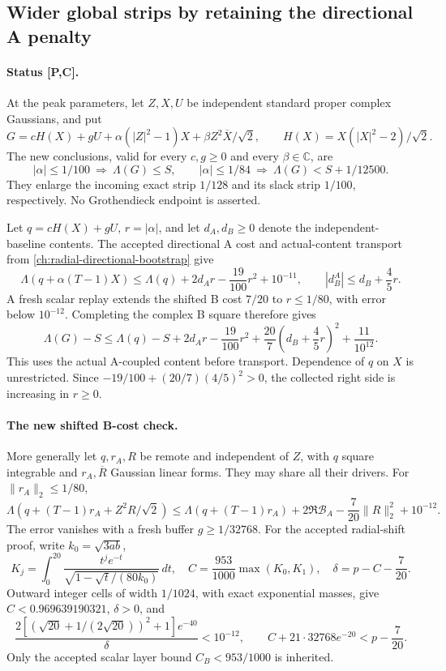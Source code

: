 \subsection{Wider global strips by retaining the directional A penalty}
\label{sec:milestone-global-strips}
\paragraph{Status \textup{[P,C]}.}
At the peak parameters, let \(Z,X,U\) be independent standard proper
complex Gaussians, and put
\[
G=cH(X)+gU+\alpha(|Z|^2-1)X+\beta Z^2\overline X/\sqrt2,
\qquad H(X)=X(|X|^2-2)/\sqrt2 .
\]
The new conclusions, valid for every \(c,g\ge0\) and every
\(\beta\in\mathbb C\), are
\[
\boxed{|\alpha|\le1/100\ \Longrightarrow\ \Lambda(G)\le S,}
\qquad
\boxed{|\alpha|\le1/84\ \Longrightarrow\ \Lambda(G)<S+1/12500.}
\]
They enlarge the incoming exact strip \(1/128\) and its slack strip
\(1/100\), respectively. No Grothendieck endpoint is asserted.

Let \(q=cH(X)+gU\), \(r=|\alpha|\), and let \(d_A,d_B\ge0\) denote
the independent-baseline contents. The accepted directional A cost
and actual-content transport from \autoref{ch:radial-directional-bootstrap} give
\[
\Lambda(q+\alpha(T-1)X)
\le\Lambda(q)+2d_A r-\frac{19}{100}r^2+10^{-11},
\qquad |d_B^A|\le d_B+\frac45r.
\]
A fresh scalar replay extends the shifted B cost \(7/20\) to
\(r\le1/80\), with error below \(10^{-12}\).
Completing the complex B square therefore gives
\begin{equation}\label{eq:milestone-strip-envelope}
\Lambda(G)-S\le\Lambda(q)-S+2d_A r-\frac{19}{100}r^2+
\frac{20}{7}\left(d_B+\frac45r\right)^2+\frac{11}{10^{12}}.
\end{equation}
This uses the actual A-coupled content before transport. Dependence
of \(q\) on \(X\) is unrestricted. Since
\(-19/100+(20/7)(4/5)^2>0\), the collected right side is increasing
in \(r\ge0\).

\paragraph{The new shifted B-cost check.}
More generally let \(q,r_A,R\) be remote and independent of \(Z\),
with \(q\) square integrable and \(r_A,\overline R\) Gaussian linear
forms. They may share all their drivers. For \(\|r_A\|_2\le1/80\),
\[
\Lambda(q+(T-1)r_A+Z^2R/\sqrt2)
\le\Lambda(q+(T-1)r_A)+2\Re\mathcal B_A
-\frac7{20}\|R\|_2^2+10^{-12}.
\]
The error vanishes with a fresh buffer \(g\ge1/32768\).
For the accepted radial-shift proof, write \(k_0=\sqrt{3ab}\),
\[
K_j=\int_0^{20}\frac{t^je^{-t}}{\sqrt{1-\sqrt t/(80k_0)}}\,dt,
\quad C=\frac{953}{1000}\max(K_0,K_1),\quad
\delta=p-C-\frac7{20}.
\]
Outward integer cells of width \(1/1024\), with exact exponential
masses, give \(C<0.969639190321\), \(\delta>0\), and
\[
\frac{2[(\sqrt{20}+1/(2\sqrt{20}))^2+1]e^{-40}}{\delta}
<10^{-12},\qquad
C+21\cdot32768e^{-20}<p-\frac7{20}.
\]
Only the accepted scalar layer bound \(C_B<953/1000\) is inherited.

